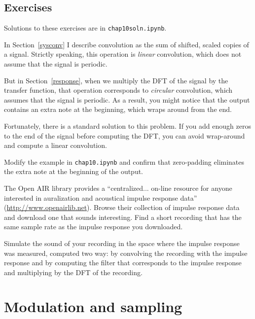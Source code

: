 \documentclass[12pt]{book}
\begin{document}
\section{Exercises}

Solutions to these exercises are in {\tt chap10soln.ipynb}.

\begin{exercise}
In Section~\ref{sysconv} I describe convolution as the sum of shifted,
scaled copies of a signal.  Strictly speaking, this operation is
{\em linear} convolution, which does not assume that the signal
is periodic.

But in Section~\ref{response}, when we multiply the
DFT of the signal by the transfer function, that operation corresponds
to {\em circular} convolution, which assumes that the signal is
periodic.  As a result, you might notice that the output contains
an extra note at the beginning, which wraps around from the end.

Fortunately, there is a standard solution to this problem.  If you
add enough zeros to the end of the signal before computing the DFT,
you can avoid wrap-around and compute a linear convolution.

Modify the example in {\tt chap10.ipynb} and confirm that zero-padding
eliminates the extra note at the beginning of the output.
\end{exercise}


\begin{exercise}
The Open AIR library provides a ``centralized... on-line resource for
anyone interested in auralization and acoustical impulse response
data'' (\url{http://www.openairlib.net}).  Browse their collection
of impulse response data and download one that sounds interesting.
Find a short recording that has the same sample rate as the impulse
response you downloaded.

Simulate the sound of your recording in the space where the impulse
response was measured, computed two way: by convolving the recording
with the impulse response and by computing the filter that corresponds
to the impulse response and multiplying by the DFT of the recording.
\end{exercise}




\chapter{Modulation and sampling}
\end{document}
